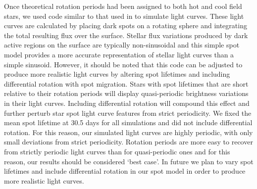 \documentclass[useAMS, usenatbib, preprint, 12pt]{aastex}
\begin{document}
Once theoretical rotation periods had been assigned to both hot and cool field
stars, we used code similar to that used in \citet{Aigrain2015b} to simulate
light curves.
These light curves are calculated by placing dark spots on a rotating sphere
and integrating the total resulting flux over the surface.
Stellar flux variations produced by dark active regions on the surface are
typically non-sinusoidal and this simple spot model provides a more accurate
representation of stellar light curves than a simple sinusoid.
However, it should be noted that this code can be adjusted to produce more
realistic light curves by altering spot lifetimes and including differential
rotation with spot migration.
Stars with spot lifetimes that are short relative to their rotation periods
will display quasi-periodic brightness variations in their light curves.
Including differential rotation will compound this effect and further perturb
star spot light curve features from strict periodicity.
We fixed the mean spot lifetime at 30.5 days for all simulations and did not
include differential rotation.
For this reason, our simulated light curves are highly periodic, with only
small deviations from strict periodicity.
Rotation periods are more easy to recover from strictly periodic light curves
than for quasi-periodic ones and for this reason, our results should be
considered `best case'.
In future we plan to vary spot lifetimes and include differential rotation in
our spot model in order to produce more realistic light curves.
\end{document}
